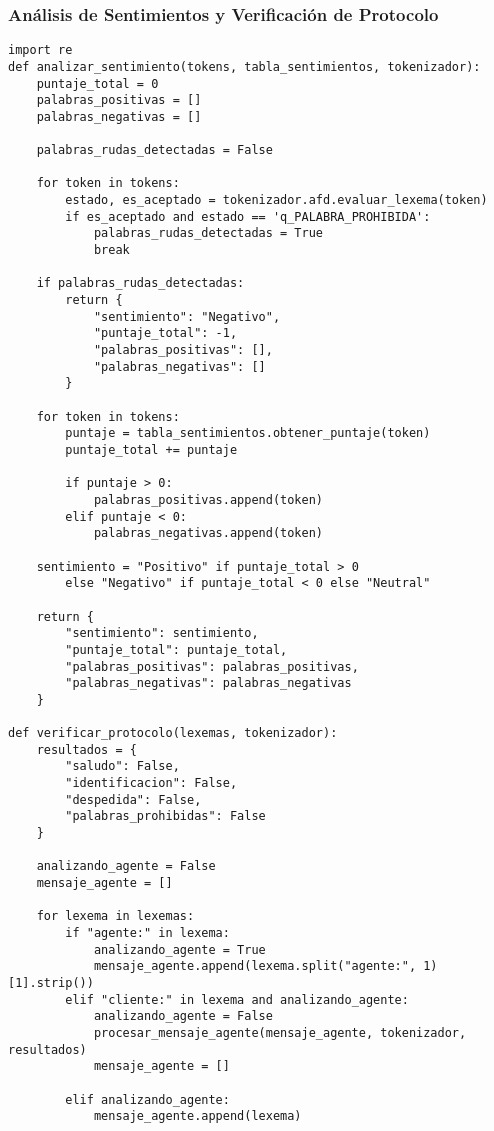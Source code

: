 \documentclass[12pt,a4paper]{scrartcl} %
\begin{document}
\subsubsection{ Análisis de Sentimientos y Verificación de Protocolo}
\begin{verbatim}
import re
def analizar_sentimiento(tokens, tabla_sentimientos, tokenizador):
    puntaje_total = 0
    palabras_positivas = []
    palabras_negativas = []

    palabras_rudas_detectadas = False

    for token in tokens:
        estado, es_aceptado = tokenizador.afd.evaluar_lexema(token)
        if es_aceptado and estado == 'q_PALABRA_PROHIBIDA':
            palabras_rudas_detectadas = True
            break 

    if palabras_rudas_detectadas:
        return {
            "sentimiento": "Negativo",
            "puntaje_total": -1,
            "palabras_positivas": [],
            "palabras_negativas": []
        }
    
    for token in tokens:
        puntaje = tabla_sentimientos.obtener_puntaje(token)
        puntaje_total += puntaje

        if puntaje > 0:
            palabras_positivas.append(token)
        elif puntaje < 0:
            palabras_negativas.append(token)
    
    sentimiento = "Positivo" if puntaje_total > 0 
        else "Negativo" if puntaje_total < 0 else "Neutral"
    
    return {
        "sentimiento": sentimiento,
        "puntaje_total": puntaje_total,
        "palabras_positivas": palabras_positivas,
        "palabras_negativas": palabras_negativas
    }

def verificar_protocolo(lexemas, tokenizador):
    resultados = {
        "saludo": False,
        "identificacion": False,
        "despedida": False,
        "palabras_prohibidas": False
    }

    analizando_agente = False
    mensaje_agente = []

    for lexema in lexemas:
        if "agente:" in lexema:
            analizando_agente = True
            mensaje_agente.append(lexema.split("agente:", 1)[1].strip())
        elif "cliente:" in lexema and analizando_agente:
            analizando_agente = False
            procesar_mensaje_agente(mensaje_agente, tokenizador, resultados)
            mensaje_agente = []  

        elif analizando_agente:
            mensaje_agente.append(lexema)


\end{verbatim}
\end{document}

